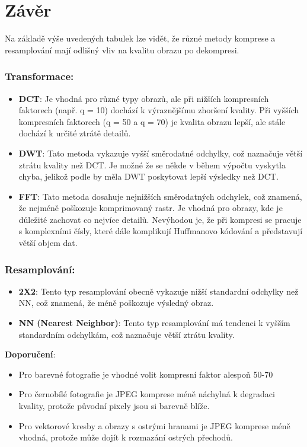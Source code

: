 \newpage
\section*{Závěr}

Na základě výše uvedených tabulek lze vidět, že různé metody komprese a resamplování mají odlišný vliv na kvalitu obrazu po dekompresi.

\subsubsection*{Transformace:}
\begin{itemize}
    \item \textbf{DCT}: Je vhodná pro různé typy obrazů, ale při nižších kompresních faktorech (např. q = 10) dochází k výraznějšímu zhoršení kvality. Při vyšších kompresních faktorech (q = 50 a q = 70) je kvalita obrazu lepší, ale stále dochází k určité ztrátě detailů.
    \item \textbf{DWT}: Tato metoda vykazuje vyšší směrodatné odchylky, což naznačuje větší ztrátu kvality než DCT. Je možné že se někde v během výpočtu vyskytla chyba, jelikož podle \cite{JPEG2000Wiki} by měla DWT poskytovat lepší výsledky než DCT.
    \item \textbf{FFT}: Tato metoda dosahuje nejnižších směrodatných odchylek, což znamená, že nejméně poškozuje komprimovaný rastr. Je vhodná pro obrazy, kde je důležité zachovat co nejvíce detailů. Nevýhodou je, že při kompresi se pracuje s komplexními čísly, které dále komplikují Huffmanovo kódování a představují větší objem dat.
\end{itemize}

\subsubsection*{Resamplování:}
\begin{itemize}
    \item \textbf{2X2}: Tento typ resamplování obecně vykazuje nižší standardní odchylky než NN, což znamená, že méně poškozuje výsledný obraz.
    \item \textbf{NN (Nearest Neighbor)}: Tento typ resamplování má tendenci k vyšším standardním odchylkám, což naznačuje větší ztrátu kvality.
\end{itemize}

\textbf{Doporučení}:
\begin{itemize}
    \item Pro barevné fotografie je vhodné volit kompresní faktor alespoň 50-70%
    \item Pro černobílé fotografie je JPEG komprese méně náchylná k degradaci kvality, protože původní pixely jsou si barevně blíže.
    \item Pro vektorové kresby a obrazy s ostrými hranami je JPEG komprese méně vhodná, protože může dojít k rozmazání ostrých přechodů.
\end{itemize}

